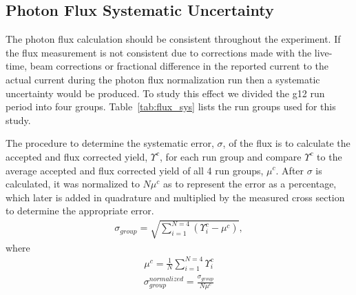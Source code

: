  		\subsection{Photon Flux Systematic Uncertainty}
 		The photon flux calculation should be consistent throughout the experiment. If the flux measurement is not consistent due to corrections made with the live-time, beam corrections or fractional difference in the reported current to the actual current during the photon flux normalization run then a systematic uncertainty would be produced. To study this effect we divided the g12 run period into four groups. Table~\ref{tab:flux_sys} lists the run groups used for this study.
 		
 		
 		The procedure to determine the systematic error, $\sigma$, of the flux is to calculate the accepted and flux corrected yield, $\Upsilon^c$, for each run group and compare $\Upsilon^c$ to the average accepted and flux corrected yield of all 4 run groups, $\mu^c$. After $\sigma$ is calculated, it was normalized to $N \mu^c$ as to represent the error as a percentage, which later is added in quadrature and  multiplied by the measured cross section to determine the appropriate error. 
 		\begin{align}
 			\sigma_{group} = \sqrt{\sum_{i=1}^{N = 4}\left(\Upsilon_i^c - \mu^c\right)},
 		\end{align}
 		where
 		\begin{align}
 			\mu^c = \frac{1}{N}\sum_{i=1}^{N=4}\Upsilon_i^c
 		\end{align}
 		\begin{align}
 			\sigma_{group}^{normalized} = \frac{\sigma_{group}}{N\mu^c}
 		\end{align}
 		

 			
 			
 			
